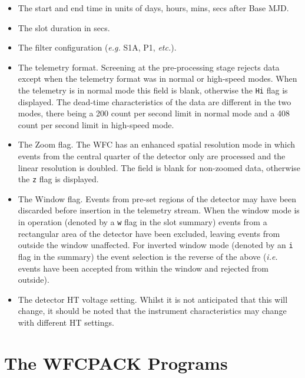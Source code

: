 \begin{itemize}

\item The start and end time in units of days, hours, mins, secs after
Base MJD.

\item The slot duration in secs.

\item The filter configuration ({\em e.g.} S1A, P1, {\em etc.}).

\item The telemetry format. Screening at the pre-processing stage
rejects data except when the telemetry format was in normal or
high-speed modes. When the telemetry is in normal mode this field is
blank, otherwise the {\tt Hi} flag is displayed. The dead-time
characteristics of the data are different in the two modes, there being
a 200 count per second limit in normal mode and a 408 count per second
limit in high-speed mode.

\item The Zoom flag. The WFC has an enhanced spatial resolution mode in
which events from the central quarter of the detector only are
processed and the linear resolution is doubled. The field is blank for
non-zoomed data, otherwise the {\tt z} flag is displayed.

\item The Window flag. Events from pre-set regions of the detector may
have been discarded before insertion in the telemetry stream. When the
window mode is in operation (denoted by a {\tt w} flag in the slot
summary) events from a rectangular area of the detector have been
excluded, leaving events from outside the window unaffected. For
inverted window mode (denoted by an {\tt i} flag in the summary) the
event selection is the reverse of the above ({\em i.e.} events have
been accepted from within the window and rejected from outside).

\item The detector HT voltage setting. Whilst it is not anticipated
that this will change, it should be noted that the instrument
characteristics may change with different HT settings.

\end{itemize}

\section{The WFCPACK Programs}
\label{sec:programs}

